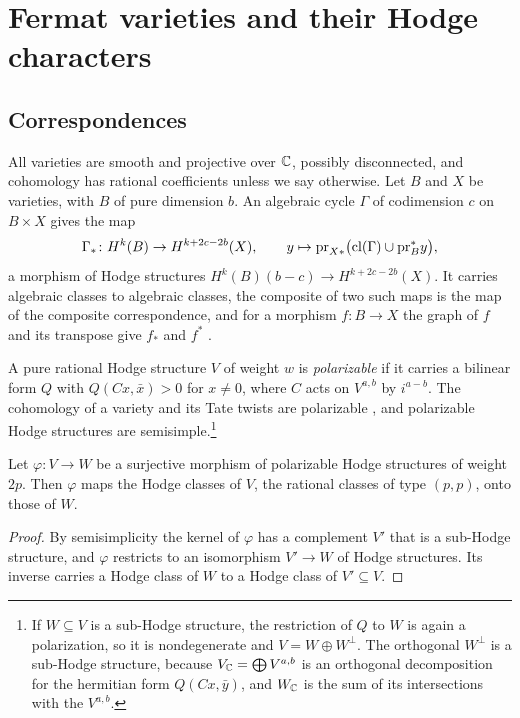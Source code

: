 \section{Fermat varieties and their Hodge characters}\label{sec:fermat}

\subsection{Correspondences}
All varieties are smooth and projective over $\mathbb{C}$, possibly disconnected,
and cohomology has rational coefficients unless we say otherwise. Let $B$
and $X$ be varieties, with $B$ of pure dimension $b$. An algebraic cycle
$\Gamma$ of codimension $c$ on $B\times X$ gives the map
\[
  \Gamma_{*}\colon H^{k}(B)\to H^{k+2c-2b}(X),\qquad
  y\mapsto\mathrm{pr}_{X*}\bigl(\operatorname{cl}(\Gamma)\cup\mathrm{pr}_{B}^{*}y\bigr),
\]
a morphism of Hodge structures $H^{k}(B)(b-c)\to H^{k+2c-2b}(X)$. It carries
algebraic classes to algebraic classes, the composite of two such maps is the
map of the composite correspondence, and for a morphism $f\colon B\to X$ the
graph of $f$ and its transpose give $f_{*}$ and $f^{*}$
\cite[Chapter~16]{Ful98}.

A pure rational Hodge structure $V$ of weight $w$ is \emph{polarizable} if
it carries a bilinear form $Q$ with $Q(Cx,\bar x)>0$ for $x\ne0$, where $C$
acts on $V^{a,b}$ by $i^{a-b}$. The cohomology of a variety and its Tate
twists are polarizable \cite[Chapter~6]{Voi02b}, and polarizable Hodge
structures are semisimple.\footnote{If $W\subseteq V$ is a sub-Hodge
structure, the restriction of $Q$ to $W$ is again a polarization, so it is
nondegenerate and $V=W\oplus W^{\perp}$. The orthogonal $W^{\perp}$ is a
sub-Hodge structure, because $V_{\mathbb{C}}=\bigoplus V^{a,b}$ is an orthogonal
decomposition for the hermitian form $Q(Cx,\bar y)$, and $W_{\mathbb{C}}$ is the sum
of its intersections with the $V^{a,b}$.}

\begin{lemma}\label{lem:lift}
Let $\varphi\colon V\to W$ be a surjective morphism of polarizable Hodge
structures of weight $2p$. Then $\varphi$ maps the Hodge classes of $V$, the
rational classes of type $(p,p)$, onto those of $W$.
\end{lemma}

\begin{proof}
By semisimplicity the kernel of $\varphi$ has a complement $V'$ that is a
sub-Hodge structure, and $\varphi$ restricts to an isomorphism $V'\to W$ of
Hodge structures. Its inverse carries a Hodge class of $W$ to a Hodge class
of $V'\subseteq V$.
\end{proof}

